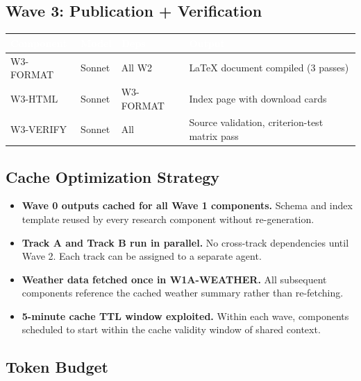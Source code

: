 \documentclass[11pt,letterpaper]{article}
\newcommand{\tableheader}[1]{\textbf{\sffamily\textcolor{white}{#1}}}
\begin{document}
\subsection{Wave 3: Publication + Verification}

\begin{center}
\begin{tabularx}{\textwidth}{L{2.5cm}C{1.2cm}L{2cm}X}
\toprule
{}
\tableheader{Component} & \tableheader{Model} & \tableheader{Deps} & \tableheader{Output} \\
\midrule
W3-FORMAT & Sonnet & All W2 & LaTeX document compiled (3 passes) \\
W3-HTML & Sonnet & W3-FORMAT & Index page with download cards \\
W3-VERIFY & Sonnet & All & Source validation, criterion-test matrix pass \\
\bottomrule
\end{tabularx}
\end{center}

\subsection{Cache Optimization Strategy}

\begin{itemize}[leftmargin=*]
\item \textbf{Wave 0 outputs cached for all Wave 1 components.} Schema and index template reused by every research component without re-generation.
\item \textbf{Track A and Track B run in parallel.} No cross-track dependencies until Wave 2. Each track can be assigned to a separate agent.
\item \textbf{Weather data fetched once in W1A-WEATHER.} All subsequent components reference the cached weather summary rather than re-fetching.
\item \textbf{5-minute cache TTL window exploited.} Within each wave, components scheduled to start within the cache validity window of shared context.
\end{itemize}

\subsection{Token Budget}
\end{document}
